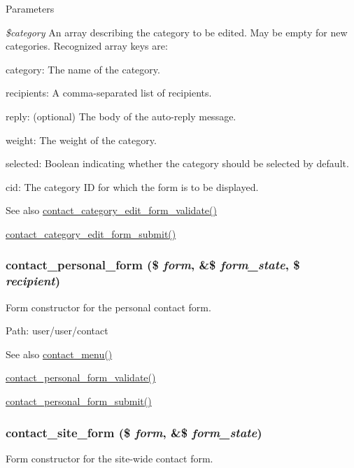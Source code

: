 \begin{DoxyParams}{Parameters}
\item[{\em \$category}]An array describing the category to be edited. May be empty for new categories. Recognized array keys are:
\begin{DoxyItemize}
\item category: The name of the category.
\item recipients: A comma-\/separated list of recipients.
\item reply: (optional) The body of the auto-\/reply message.
\item weight: The weight of the category.
\item selected: Boolean indicating whether the category should be selected by default.
\item cid: The category ID for which the form is to be displayed.
\end{DoxyItemize}\end{DoxyParams}
\begin{DoxySeeAlso}{See also}
\hyperlink{contact_8admin_8inc_a6d89c84e8d85557599491e121adc0faa}{contact\_\-category\_\-edit\_\-form\_\-validate()} 

\hyperlink{contact_8admin_8inc_a3bd710e3ce90722af2a776e664a0f813}{contact\_\-category\_\-edit\_\-form\_\-submit()} 
\end{DoxySeeAlso}
\hypertarget{group__forms_ga7dfdb8ed0a4456f0f2070b6efd64f280}{
\subsubsection[{contact\_\-personal\_\-form}]{\setlength{\rightskip}{0pt plus 5cm}contact\_\-personal\_\-form (\$ {\em form}, \/  \&\$ {\em form\_\-state}, \/  \$ {\em recipient})}}
\label{group__forms_ga7dfdb8ed0a4456f0f2070b6efd64f280}
Form constructor for the personal contact form.

Path: user/user/contact

\begin{DoxySeeAlso}{See also}
\hyperlink{contact_8module_aa553b7cf1c3901cce1c2a8c4a04c5212}{contact\_\-menu()} 

\hyperlink{contact_8pages_8inc_aae358ed0604f1e51cb6d1a1e830f81fd}{contact\_\-personal\_\-form\_\-validate()} 

\hyperlink{contact_8pages_8inc_a51522c699a24af2fb7fb613c3a0dd6e4}{contact\_\-personal\_\-form\_\-submit()} 
\end{DoxySeeAlso}
\hypertarget{group__forms_gabc4466031f99ab64b6b65e4fdbf4291d}{
\subsubsection[{contact\_\-site\_\-form}]{\setlength{\rightskip}{0pt plus 5cm}contact\_\-site\_\-form (\$ {\em form}, \/  \&\$ {\em form\_\-state})}}
\label{group__forms_gabc4466031f99ab64b6b65e4fdbf4291d}
Form constructor for the site-\/wide contact form.

